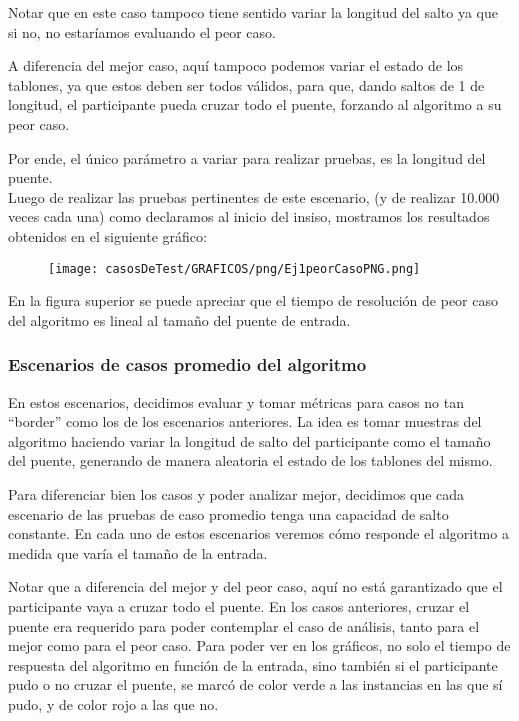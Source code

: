 \noindent Notar que en este caso tampoco tiene sentido variar la longitud del salto ya que si no, no estaríamos evaluando el peor caso.

\noindent A diferencia del mejor caso, aquí tampoco podemos variar el estado de los tablones, ya que estos deben ser todos válidos, para que, dando saltos de 1 de longitud, el participante pueda cruzar todo el puente, forzando al algoritmo a su peor caso.

\noindent Por ende, el único parámetro a variar para realizar pruebas, es la longitud del puente.\\

\noindent Luego de realizar las pruebas pertinentes de este escenario, (y de realizar  10.000 veces cada una) como declaramos al inicio del insiso, mostramos los resultados obtenidos en el siguiente gráfico:\\

	\begin{figure}[h]
		\begin{center}
		   \texttt{[image: casosDeTest/GRAFICOS/png/Ej1peorCasoPNG.png]}
		\end{center}
	\end{figure}

En la figura superior se puede apreciar que el tiempo de resolución de peor caso del algoritmo es lineal al tamaño del puente de entrada.

\subsubsection{Escenarios de casos promedio del algoritmo}

\noindent En estos escenarios, decidimos evaluar y tomar métricas para casos no tan “border”  como los de los escenarios anteriores. La idea es tomar muestras del algoritmo haciendo variar la longitud de salto del participante como el tamaño del puente, generando de manera aleatoria el estado de los tablones del mismo.

\noindent Para diferenciar bien los casos y poder analizar mejor, decidimos que cada escenario de las pruebas de caso promedio tenga una capacidad de salto constante. En cada uno de estos escenarios veremos cómo responde el algoritmo a medida que varía el tamaño de la entrada.

\noindent Notar que a diferencia  del mejor y del peor caso, aquí no está garantizado que el participante vaya a cruzar todo el puente. En los casos anteriores, cruzar el puente era requerido para poder contemplar el caso de análisis, tanto para el mejor como para el peor caso. Para poder ver en los gráficos, no solo el tiempo de respuesta del algoritmo en función de la entrada, sino también si el participante pudo o no cruzar el puente, se marcó de color verde a las instancias en las que sí pudo, y de color rojo a las que no.


